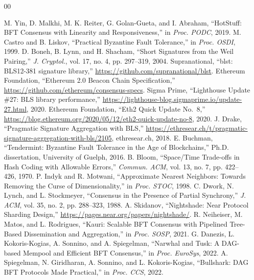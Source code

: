 \documentclass[conference]{IEEEtran}
\begin{document}
\begin{thebibliography}{00}

 M. Yin, D. Malkhi, M. K. Reiter, G. Golan-Gueta, and I. Abraham, ``HotStuff: BFT Consensus with Linearity and Responsiveness,'' in \textit{Proc. PODC}, 2019.
 M. Castro and B. Liskov, ``Practical Byzantine Fault Tolerance,'' in \textit{Proc. OSDI}, 1999.
 D. Boneh, B. Lynn, and H. Shacham, ``Short Signatures from the Weil Pairing,'' \textit{J. Cryptol.}, vol. 17, no. 4, pp. 297--319, 2004.
 Supranational, ``blst: BLS12-381 signature library,'' \url{https://github.com/supranational/blst}.
 Ethereum Foundation, ``Ethereum 2.0 Beacon Chain Specification,'' \url{https://github.com/ethereum/consensus-specs}.
 Sigma Prime, ``Lighthouse Update \#27: BLS library performance,'' \url{https://lighthouse-blog.sigmaprime.io/update-27.html}, 2020.
 Ethereum Foundation, ``Eth2 Quick Update No.\ 8,'' \url{https://blog.ethereum.org/2020/05/12/eth2-quick-update-no-8}, 2020.
 J. Drake, ``Pragmatic Signature Aggregation with BLS,'' \url{https://ethresear.ch/t/pragmatic-signature-aggregation-with-bls/2105}, ethresear.ch, 2018.
 E. Buchman, ``Tendermint: Byzantine Fault Tolerance in the Age of Blockchains,'' Ph.D. dissertation, University of Guelph, 2016.
 B. Bloom, ``Space/Time Trade-offs in Hash Coding with Allowable Errors,'' \textit{Commun. ACM}, vol. 13, no. 7, pp. 422--426, 1970.
 P. Indyk and R. Motwani, ``Approximate Nearest Neighbors: Towards Removing the Curse of Dimensionality,'' in \textit{Proc. STOC}, 1998.
 C. Dwork, N. Lynch, and L. Stockmeyer, ``Consensus in the Presence of Partial Synchrony,'' \textit{J. ACM}, vol. 35, no. 2, pp. 288--323, 1988.
 A. Skidanov, ``Nightshade: Near Protocol Sharding Design,'' \url{https://pages.near.org/papers/nightshade/}.
 R. Neiheiser, M. Matos, and L. Rodrigues, ``Kauri: Scalable BFT Consensus with Pipelined Tree-Based Dissemination and Aggregation,'' in \textit{Proc. SOSP}, 2021.
 G. Danezis, L. Kokoris-Kogias, A. Sonnino, and A. Spiegelman, ``Narwhal and Tusk: A DAG-based Mempool and Efficient BFT Consensus,'' in \textit{Proc. EuroSys}, 2022.
 A. Spiegelman, N. Giridharan, A. Sonnino, and L. Kokoris-Kogias, ``Bullshark: DAG BFT Protocols Made Practical,'' in \textit{Proc. CCS}, 2022.

\end{thebibliography}
\end{document}
